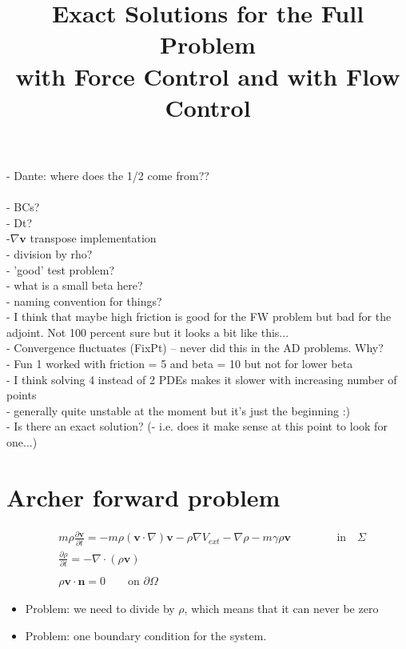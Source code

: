 \documentclass[11pt, a4paper]{article}
\title{Exact Solutions for the Full Problem \\with Force Control and with Flow Control}
\date{}
\theoremstyle{definition}
\newcommand{\Sta}{\rho}
\newcommand{\Stav}{\mathbf{v}}
\begin{document}
	- Dante: where does the 1/2 come from??\\
	\\
	- BCs?\\
	- Dt?\\
	-$\nabla \Stav$ transpose implementation\\
	- division by rho?\\
	- 'good' test problem?\\
    - what is a small beta here?\\
    - naming convention for things?\\
    - I think that maybe high friction is good for the FW problem but bad for the adjoint. Not 100 percent sure but it looks a bit like this...\\
    - Convergence fluctuates (FixPt) -- never did this in the AD problems. Why?\\
    - Fun 1 worked with friction = 5 and beta = 10 but not for lower beta\\
    - I think solving 4 instead of 2 PDEs makes it slower with increasing number of points\\
    - generally quite unstable at the moment but it's just the beginning :)\\
    - Is there an exact solution? (- i.e. does it make sense at this point to look for one...)
    
	
	
	
\section{Archer forward problem}
\begin{align*}
&m \Sta \frac{\partial \Stav}{\partial t} = - m \Sta (\Stav \cdot \nabla)\Stav - \Sta \nabla V_{ext} - \nabla \Sta - m \gamma \Sta \Stav\ \ \ \qquad \ \ \quad\text{in} \quad \Sigma\\
&\frac{\partial \Sta}{\partial t} = - \nabla \cdot (\Sta \Stav)\\
\\
&\Sta \Stav \cdot \mathbf{n} =0	\qquad\text{on } \partial \Omega
\end{align*}
\begin{itemize}
	\item Problem: we need to divide by $\rho$, which means that it can never be zero
	\item Problem: one boundary condition for the system. 
\end{itemize}
\end{document}
